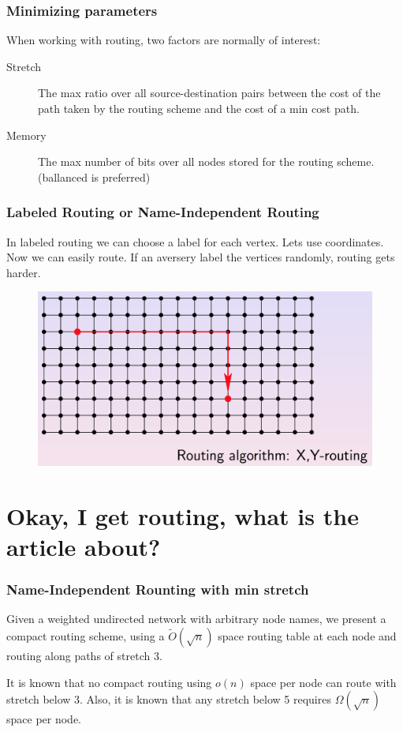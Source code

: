\documentclass[10pt, compress]{beamer}
\begin{document}
\begin{frame}[fragile]
  \frametitle{Minimizing parameters}
  When working with routing, two factors are normally of interest:
  \begin{description}
    \item[Stretch] The max ratio over all source-destination pairs between the
        cost of the path taken by the routing scheme and the cost of a min
        cost path.
    \item[Memory] The max number of bits over all nodes stored for the routing
        scheme. (ballanced is preferred)
  \end{description}
\end{frame}

\begin{frame}[fragile]
  \frametitle{Labeled Routing or Name-Independent Routing}

  In labeled routing we can choose a label for each vertex.
  Lets use coordinates. Now we can easily route. If an aversery
  label the vertices randomly, routing gets harder.

  \begin{figure}
    \includegraphics[scale=0.3]{images/xyrouting.png} 
  \end{figure}
\end{frame}

\section{Okay, I get routing, what is the article about?}

\begin{frame}[fragile]
  \frametitle{Name-Independent Rounting with min stretch}
    Given a weighted undirected network with arbitrary node names, we present
    a compact routing scheme, using a $\tilde{O}(\sqrt{n})$ space routing
    table at each node and routing along paths of stretch 3.

    It is known that no compact routing using $o(n)$ space per node can route
    with stretch below 3. Also, it is known that any stretch below 5 requires
    $\Omega(\sqrt{n})$ space per node.
\end{frame}
\end{document}
